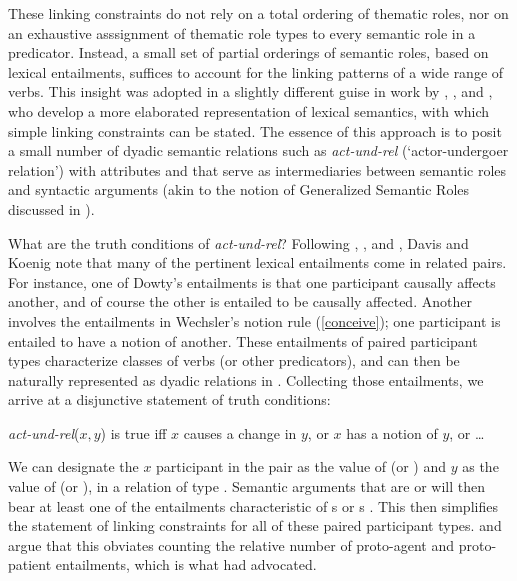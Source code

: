 \documentclass[output=paper
	        ,collection
	        ,collectionchapter
 	        ,biblatex
                ,babelshorthands
                ,newtxmath
                ,draftmode
                ,colorlinks, citecolor=brown
]{langscibook}
\begin{document}
These linking constraints do not rely on a total ordering of thematic roles, nor on an exhaustive asssignment of thematic role types to every semantic role in a predicator. Instead, a small set of partial orderings of semantic roles, based on lexical entailments, suffices to account for the linking patterns of a wide range of verbs. 
This insight was adopted in a slightly different guise in work by \citet{Davis1996}, \citet{Davis2001}, and \cite{DavisandKoenig2000b}, who develop a more elaborated representation of lexical semantics, with which simple linking constraints can be stated.
The essence of this approach is to posit a small number of dyadic semantic relations such as \textit{act-und-rel} (`actor-undergoer relation') with attributes    and   that serve as intermediaries between semantic roles and syntactic arguments (akin to the notion of Generalized Semantic Roles discussed in \citealt{VanValin1999}).  

What are the truth conditions of \textit{act-und-rel}?  
Following \citet{Fillmore1977}, \citet{Dowty1991}, and \citet{Wechsler1995b}, Davis and Koenig note that many of the pertinent lexical entailments come in related pairs.
For instance, one of Dowty's entailments is that one participant causally affects another, and of course the other is entailed to be causally affected.
Another involves the entailments in Wechsler's notion rule (\ref{conceive}); one participant is entailed to have a notion of another. 
These entailments of paired participant types characterize classes of verbs (or other predicators), and can then be naturally represented as dyadic relations in .  Collecting those entailments, we arrive at a disjunctive statement of truth conditions:

\ea
\label{def-act-und-rel}
\textit{act-und-rel}($x,y$) is true iff $x$ causes a change in $y$, or $x$ has a notion of $y$, or \ldots
\z

\noindent
We can designate the $x$ participant  in the pair as the value of  (or ) and $y$ as the value of  (or ), in a relation of type .   Semantic arguments that are  or  will then bear at least one of the entailments characteristic of s or s \citep[72]{DavisandKoenig2000b}. This then simplifies the statement of linking constraints for all of these paired participant types.
\citet{Davis1996} and \citet{KoenigandDavis2001} argue that this obviates counting the relative number of proto-agent and proto-patient entailments, which is what  \citet{Dowty1991} had advocated.
\end{document}
